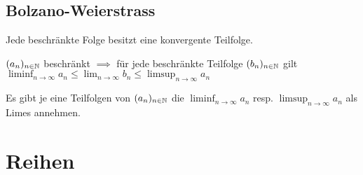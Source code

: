\subsection{Bolzano-Weierstrass}
Jede beschränkte Folge besitzt eine konvergente Teilfolge.
\begin{compactitem}
    \item $(a_n)_{n \in \mathbb{N}}$ beschränkt $\implies$ für jede beschränkte Teilfolge $(b_n)_{n \in \mathbb{N}}$ gilt $\liminf_{n \to \infty} a_n \le \lim_{n \to \infty} b_n \le  \limsup_{n \to \infty} a_n$
    \item Es gibt je eine Teilfolgen von $(a_n)_{n \in \mathbb{N}}$ die $\liminf_{n \to \infty} a_n$ resp. $\limsup_{n \to \infty} a_n$ als Limes annehmen.
\end{compactitem}


\section{Reihen}

